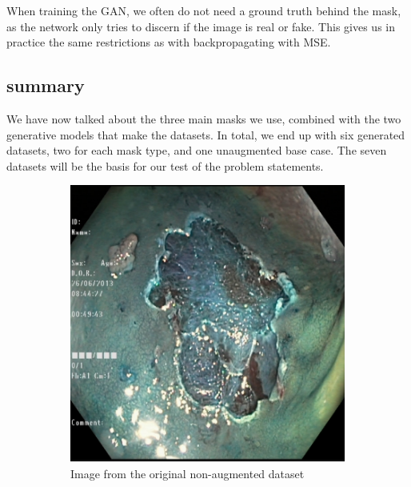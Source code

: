 When training the GAN, we often do not need a ground truth behind the mask, as the network only tries to discern if the image is real or fake. This gives us in practice the same restrictions as with backpropagating with MSE.

\subsection{summary}
We have now talked about the three main masks we use, combined with the two generative models that make the datasets.
In total, we end up with six generated datasets, two for each mask type, and one unaugmented base case.
The seven datasets will be the basis for our test of the problem statements. 



\begin{figure}
     \centering
     \begin{subfigure}[t]{0.4\textwidth}
         \centering
         \includegraphics[width=\textwidth]{methodology/figures/nomask.png}
         \caption{Image from the original non-augmented dataset}
         \label{fig:CornerMask}
     \end{subfigure}
     \hfill
     \begin{subfigure}[t]{0.4\textwidth}
         \centering

\end{subfigure}
\end{figure}
